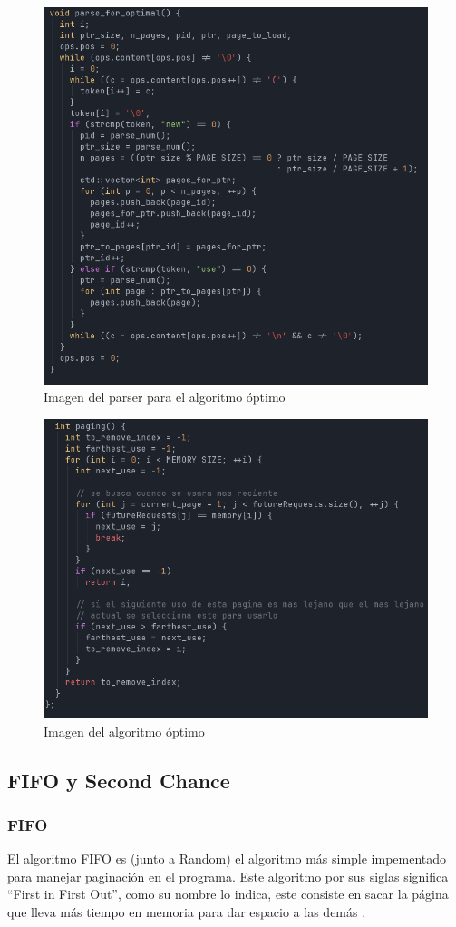 \documentclass{report}
\begin{document}
\begin{figure}[h]
	\centering
	\includegraphics[width=0.8\linewidth]{figuras/parse_optimal.png}
	\caption{Imagen del parser para el algoritmo óptimo}
	\label{fig:parse_optimal}
\end{figure}

\begin{figure}[h]
	\centering
	\includegraphics[width=0.8\linewidth]{figuras/optimal.png}
	\caption{Imagen del algoritmo óptimo}
	\label{fig:optimal}
\end{figure}


\subsection{FIFO y Second Chance}
\subsubsection{FIFO}
El algoritmo FIFO es (junto a Random) el algoritmo más simple impementado para manejar paginación en el programa.
Este algoritmo por sus siglas significa ``First in First Out'', como su nombre lo indica, este consiste en sacar la página que lleva más tiempo en memoria para dar espacio a las demás \cite{ref0}. \\
\end{document}
